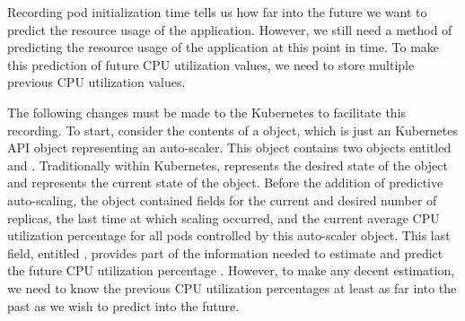 Recording pod initialization time tells us how far into the future
we want to predict the resource usage of the application. However, we still need
a method of predicting the resource usage of the application at this point in
time. To make this prediction of future CPU utilization values,
we need to store multiple previous CPU utilization values.

The following changes must be made to the Kubernetes to facilitate this
recording. To start,
consider the contents of a  object, which is
just an Kubernetes API object representing an auto-scaler. This object contains
two objects entitled  and
. Traditionally within
Kubernetes,  represents the desired state of the object and
 represents the current state of the object. Before the addition
of predictive auto-scaling, the  object
contained fields for the current and desired number of replicas, the last time
at which scaling occurred, and the current average CPU utilization percentage for
all pods controlled by this auto-scaler object. This last field, entitled
, provides part of the information
needed to estimate and predict the future CPU utilization
percentage \cite{k8s-horizontal-pod-autoscaler-object}.
However, to make any decent estimation, we need to know the previous CPU
utilization percentages at least as far into the past as we wish to predict into
the future.

